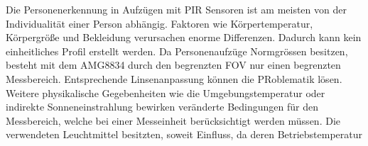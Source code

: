 Die Personenerkennung in Aufzügen mit \ac{PIR} Sensoren ist am meisten von der Individualität einer Person abhängig. Faktoren wie Körpertemperatur, Körpergröße und Bekleidung verursachen enorme Differenzen. Dadurch kann kein einheitliches Profil erstellt werden. Da Personenaufzüge Normgrössen besitzen, besteht mit dem AMG8834 durch den begrenzten \ac{FOV} nur einen begrenzten Messbereich. Entsprechende Linsenanpassung können die PRoblematik lösen. 
Weitere physikalische Gegebenheiten wie die Umgebungstemperatur oder indirekte Sonneneinstrahlung bewirken veränderte Bedingungen für den Messbereich, welche bei einer Messeinheit berücksichtigt werden müssen. Die verwendeten Leuchtmittel besitzten, soweit Einfluss, da deren Betriebstemperatur      


